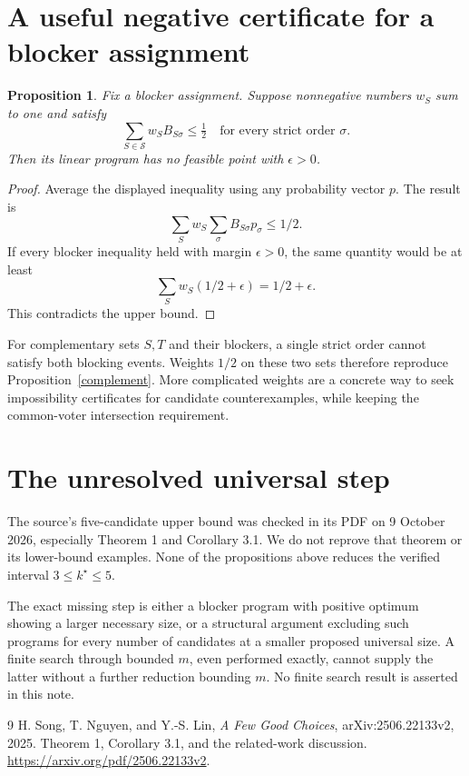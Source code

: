 \documentclass[11pt]{article}
\newtheorem{proposition}[theorem]{Proposition}
\theoremstyle{definition}
\begin{document}
\section{A useful negative certificate for a blocker assignment}
\begin{proposition}\label{weights}
Fix a blocker assignment. Suppose nonnegative numbers $w_S$ sum to one
and satisfy
\[
 \sum_{S\in\mathcal S}w_SB_{S\sigma}\le\tfrac12
                    \quad\text{for every strict order }\sigma.
\]
Then its linear program has no feasible point with $\epsilon>0$.
\end{proposition}
\begin{proof}
Average the displayed inequality using any probability vector $p$.
The result is
\[\sum_Sw_S\sum_\sigma B_{S\sigma}p_\sigma\le1/2.\]
If every blocker inequality held with margin $\epsilon>0$, the same
quantity would be at least
\[\sum_Sw_S(1/2+\epsilon)=1/2+\epsilon.\]
This contradicts the upper bound.
\end{proof}
For complementary sets $S,T$ and their blockers, a single strict order
cannot satisfy both blocking events. Weights $1/2$ on these two sets
therefore reproduce Proposition~\ref{complement}. More complicated
weights are a concrete way to seek impossibility certificates for candidate
counterexamples, while keeping the common-voter intersection requirement.

\section{The unresolved universal step}
The source's five-candidate upper bound was checked in its PDF on
9 October 2026, especially Theorem 1 and Corollary 3.1. We do not reprove
that theorem or its lower-bound examples. None of the propositions above
reduces the verified interval $3\le k^\star\le5$.

The exact missing step is either a blocker program with positive optimum
showing a larger necessary size, or a structural argument excluding such
programs for every number of candidates at a smaller proposed universal
size. A finite search through bounded $m$, even performed exactly, cannot
supply the latter without a further reduction bounding $m$. No finite
search result is asserted in this note.
\begin{thebibliography}{9}
 H. Song, T. Nguyen, and Y.-S. Lin,
\emph{A Few Good Choices}, arXiv:2506.22133v2, 2025.
Theorem 1, Corollary 3.1, and the related-work discussion.
\url{https://arxiv.org/pdf/2506.22133v2}.
\end{thebibliography}
\end{document}
